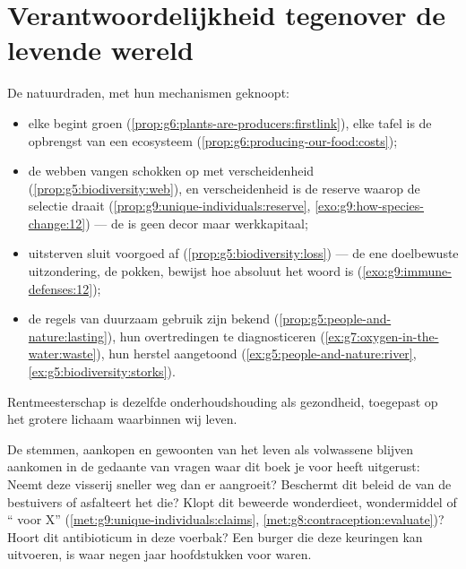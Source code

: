\section{Verantwoordelijkheid tegenover de levende wereld}

\begin{proposition}\label{prop:g9:our-responsibility:stewardship}
De natuurdraden, met hun mechanismen geknoopt:
\begin{itemize}
  \item elke  begint groen
        (\cref{prop:g6:plants-are-producers:firstlink}), elke
        tafel is de opbrengst van een ecosysteem
        (\cref{prop:g6:producing-our-food:costs});
  \item de webben vangen schokken op met verscheidenheid
        (\cref{prop:g5:biodiversity:web}), en verscheidenheid is
        de reserve waarop de selectie draait
        (\cref{prop:g9:unique-individuals:reserve},
        \cref{exo:g9:how-species-change:12}) ---
        de  is geen decor maar werkkapitaal;
  \item uitsterven sluit voorgoed af
        (\cref{prop:g5:biodiversity:loss}) --- de ene doelbewuste
        uitzondering, de pokken, bewijst hoe absoluut het woord is
        (\cref{exo:g9:immune-defenses:12});
  \item de regels van duurzaam gebruik zijn bekend
        (\cref{prop:g5:people-and-nature:lasting}), hun
        overtredingen te diagnosticeren
        (\cref{ex:g7:oxygen-in-the-water:waste}), hun herstel
        aangetoond
        (\cref{ex:g5:people-and-nature:river},
        \cref{ex:g5:biodiversity:storks}).
\end{itemize}
Rentmeesterschap is dezelfde onderhoudshouding als gezondheid,
toegepast op het grotere lichaam waarbinnen wij leven.
\end{proposition}
\admitted

\begin{example}\label{ex:g9:our-responsibility:citizen}
De stemmen, aankopen en gewoonten van het leven als volwassene
blijven aankomen in de gedaante van vragen waar dit boek je voor
heeft uitgerust: Neemt deze visserij sneller weg dan er aangroeit?
Beschermt dit beleid de  van de bestuivers of asfalteert
het die? Klopt dit beweerde wonderdieet, wondermiddel of `` voor
X'' (\cref{met:g9:unique-individuals:claims},
\cref{met:g8:contraception:evaluate})? Hoort dit antibioticum in
deze voerbak? Een burger die deze keuringen kan uitvoeren, is
waar negen jaar hoofdstukken voor waren.
\end{example}

